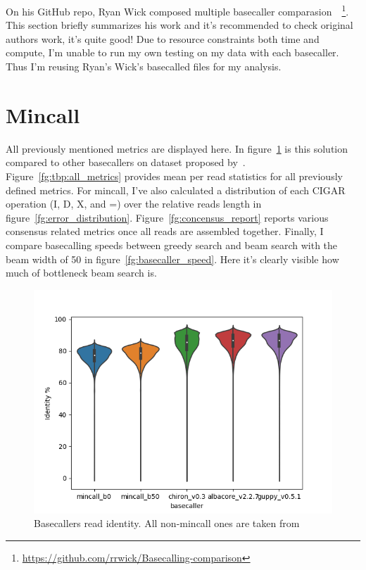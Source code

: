 \documentclass[times, utf8, diplomski, english]{fer}
\begin{document}
On his GitHub repo, Ryan Wick composed multiple basecaller comparasion~\citep{rwick_basecalling_cmp}~\footnote{\url{https://github.com/rrwick/Basecalling-comparison}}. 
This section briefly summarizes his work and it's recommended to check original authors work, it's quite good! 
Due to resource constraints both time and compute, I'm unable to run my own testing on my data with each basecaller. Thus I'm reusing Ryan's Wick's basecalled files for my analysis. 

\section{Mincall}
All previously mentioned metrics are displayed here. In figure~\ref{fg:identity_rate} is this solution compared to other basecallers on dataset proposed by~\citep{rwick_basecalling_cmp}.
Figure~\ref{fg:tbp:all_metrics} provides mean per read statistics for all previously defined metrics. 
For mincall, I've also calculated a distribution of each CIGAR operation (I, D, X, and =) over the relative reads length in figure~\ref{fg:error_distribution}.
Figure~\ref{fg:concensus_report} reports various consensus related metrics once all reads are assembled together.
Finally, I compare basecalling speeds between greedy search and beam search with the beam width of 50 in figure~\ref{fg:basecaller_speed}. 
Here it's clearly visible how much of bottleneck beam search is.

\begin{figure}
    \begin{center}
        \includegraphics[width=\textwidth]{read_violin_Identity}
    \end{center}
    \caption{Basecallers read identity. All non-mincall ones are taken from~\cite{rwick_basecalling_cmp}}
    \label{fg:identity_rate}
\end{figure}
\end{document}
